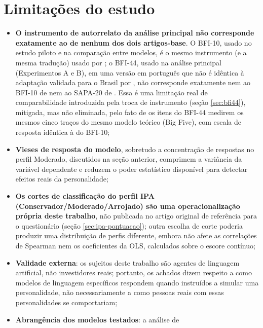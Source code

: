 \section{Limitações do estudo}
\label{sec:limitacoes}

\begin{itemize}
    \item \textbf{O instrumento de autorrelato da análise principal não
    corresponde exatamente ao de nenhum dos dois artigos-base}. O BFI-10,
    usado no estudo piloto e na comparação entre modelos, é o mesmo
    instrumento (e a mesma tradução) usado por
    ; o BFI-44, usado na análise principal
    (Experimentos A e B), em uma versão em português que não é idêntica
    à adaptação validada para o Brasil por , não
    corresponde exatamente nem ao BFI-10 de 
    nem ao SAPA-20 de . Essa é uma
    limitação real de comparabilidade introduzida pela troca de
    instrumento (seção \ref{sec:bfi44}), mitigada, mas não eliminada,
    pelo fato de os itens do BFI-44 medirem os mesmos cinco traços do
    mesmo modelo teórico (Big Five), com escala de resposta idêntica à do
    BFI-10;
    \item \textbf{Vieses de resposta do modelo}, sobretudo a
    concentração de respostas no perfil Moderado, discutidos na seção
    anterior, comprimem a variância da variável dependente e reduzem o
    poder estatístico disponível para detectar efeitos reais da
    personalidade;
    \item \textbf{Os cortes de classificação do perfil IPA
    (Conservador/\allowbreak Moderado/\allowbreak Arrojado) são uma
    operacionalização própria deste trabalho}, não publicada no artigo
    original de referência para o questionário (seção
    \ref{sec:ipa-pontuacao}); outra escolha de corte poderia produzir uma
    distribuição de perfis diferente, embora não afete as correlações de
    Spearman nem os coeficientes da OLS, calculados sobre o escore
    contínuo;
    \item \textbf{Validade externa}: os sujeitos deste trabalho são
    agentes de linguagem artificial, não investidores reais; portanto, os
    achados dizem respeito a como modelos de linguagem específicos
    respondem quando instruídos a simular uma personalidade, não
    necessariamente a como pessoas reais com essas personalidades se
    comportariam;
    \item \textbf{Abrangência dos modelos testados}: a análise de

\end{itemize}

